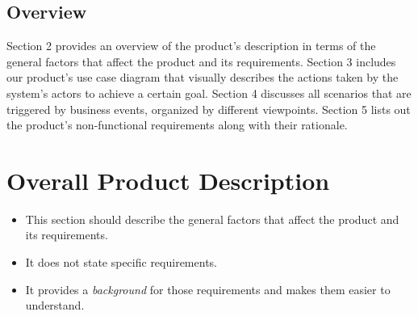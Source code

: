 \documentclass[]{article}
\begin{document}
\subsection{Overview}
\label{sub:overview}
Section 2 provides an overview of the product’s description in terms of the general factors that affect the product and its requirements. Section 3 includes our product’s use case diagram that visually describes the actions taken by the system’s actors to achieve a certain goal. Section 4 discusses all scenarios that are triggered by business events, organized by different viewpoints. Section 5 lists out the product’s non-functional requirements along with their rationale.


\section{Overall Product Description}
\label{sec:overall_description}
\begin{itemize}
	\item This section should describe the general factors that affect the product and its requirements.
	\item It does not state specific requirements.
	\item It provides a \emph{background} for those requirements and makes them easier to understand.
\end{itemize}
\end{document}
